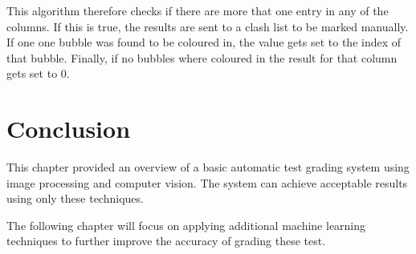 This algorithm therefore checks if there are more that one entry in any of the columns. If this is true, the results are sent to a clash list to be marked manually. If one one bubble was found to be coloured in, the value gets set to the index of that bubble. Finally, if no bubbles where coloured in the result for that column gets set to 0.

\section{Conclusion}

This chapter provided an overview of a basic automatic test grading system using image processing and computer vision. The system can achieve acceptable results using only these techniques.

The following chapter will focus on applying additional machine learning techniques to further improve the accuracy of grading these test.